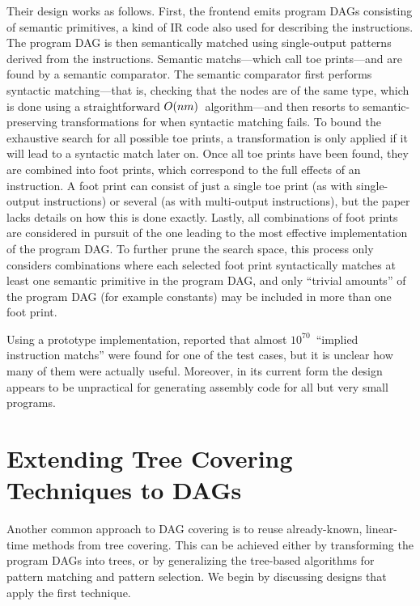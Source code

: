 Their design works as follows.
%
First, the \gls{frontend} emits \glspl{program
  DAG} consisting of \glspl{semantic primitive}, a kind of \gls{IR} code also used
for describing the \glspl{instruction}.
%
The \gls{program DAG} is then
semantically matched using single-output \glspl{pattern} derived from the
\glspl{instruction}.
%
Semantic \glspl{match}---which \citeauthor{Hoover1996}
call \glspl{toe print}---and are found by a \gls{semantic comparator}.
%
The
\gls{semantic comparator} first performs syntactic matching---that is, checking
that the \glspl{node} are of the same type, which is done using a
straightforward \mbox{$O(nm)$}~algorithm---and then resorts to
semantic-preserving transformations for when syntactic matching fails.
%
To bound
the exhaustive search for all possible \glspl{toe print}, a transformation is
only applied if it will lead to a syntactic \gls{match} later on.
%
 Once all
\glspl{toe print} have been found, they are combined into \glspl{foot print},
which correspond to the full effects of an \gls{instruction}.
%
A \gls{foot print}
can consist of just a single \gls{toe print} (as with \glspl{single-output
  instruction}) or several (as with \glspl{multi-output instruction}), but the
paper lacks details on how this is done exactly.
%
Lastly, all combinations of
\glspl{foot print} are considered in pursuit of the one leading to the most
effective implementation of the \gls{program DAG}.
%
To further prune the search
space, this process only considers combinations where each selected \gls{foot
  print} syntactically matches at least one \gls{semantic primitive} in the
\gls{program DAG}, and only ``trivial amounts'' of the \gls{program DAG} (for
example constants) may be included in more than one \gls{foot print}.

Using a prototype implementation, \citeauthor{Hoover1996} reported that almost
$10^{70}$~``implied \gls{instruction} \glspl{match}'' were found for one of the
test cases, but it is unclear how many of them were actually useful.
%
Moreover,
in its current form the design appears to be unpractical for generating
\gls{assembly code} for all but very small \glspl{program}.


\section{Extending Tree Covering Techniques to DAGs}

Another common approach to \gls{DAG covering} is to reuse already-known,
linear-time methods from \gls{tree covering}.
%
This can be achieved either by
transforming the \glspl{program DAG} into \glspl{tree}, or by generalizing the
\gls{tree}-based algorithms for \gls{pattern matching} and \gls{pattern
  selection}.
%
We begin by discussing designs that apply the first technique.


